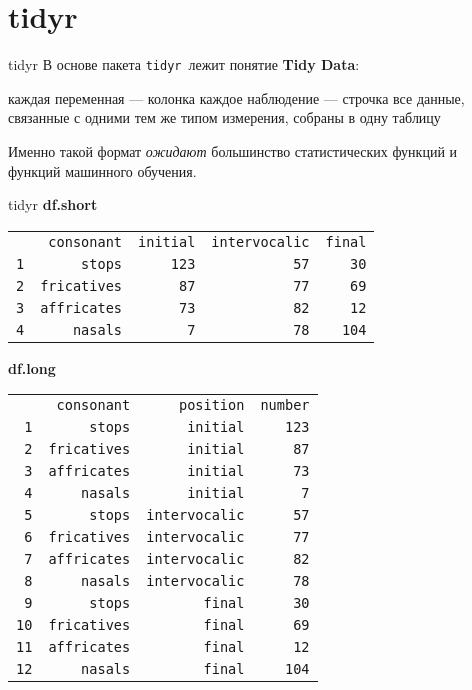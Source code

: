 \section{tidyr}
\begin{frame}{tidyr}
В основе пакета \scriptsize\verb"tidyr"\normalsize\ лежит понятие \textbf{Tidy Data}:
\begin{itemize}
\mytem каждая переменная — колонка
\mytem каждое наблюдение — строчка
\mytem все данные, связанные с одними тем же типом измерения, собраны в одну таблицу
\end{itemize}
Именно такой формат \textit{ожидают} большинство статистических функций и функций машинного обучения.
\end{frame}
\begin{frame}{tidyr}
\textbf{df.short}\\
\scriptsize
\begin{alltt}
\begin{tabular}{rrrrr}
 & consonant & initial & intervocalic & final \\ 
1 & stops & 123 & 57 & 30 \\ 
2 & fricatives & 87 & 77 & 69 \\ 
3 & affricates & 73 & 82 & 12 \\ 
4 & nasals & 7 & 78 & 104 \\ 
\end{tabular}
\end{alltt}
\normalsize
\textbf{df.long}\\
\scriptsize
\begin{alltt}
\begin{tabular}{rrrr}
 & consonant & position & number \\ 
1 & stops & initial & 123 \\ 
2 & fricatives & initial & 87 \\ 
3 & affricates & initial & 73 \\ 
4 & nasals & initial & 7 \\ 
5 & stops & intervocalic & 57 \\ 
6 & fricatives & intervocalic & 77 \\ 
7 & affricates & intervocalic & 82 \\ 
8 & nasals & intervocalic & 78 \\ 
9 & stops & final & 30 \\ 
10 & fricatives & final & 69 \\ 
11 & affricates & final & 12 \\ 
12 & nasals & final & 104 \\ 
\end{tabular}
\end{alltt}
\normalsize
\end{frame}

